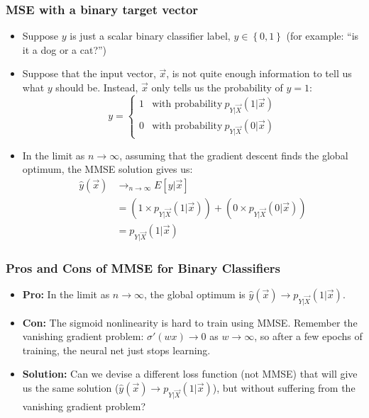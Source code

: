\documentclass{beamer}
\begin{document}
\begin{frame}
  \frametitle{MSE with a binary target vector}
  \begin{itemize}
  \item Suppose $y$ is just a scalar binary classifier label,
    $y\in\left\{0,1\right\}$ (for example: ``is it a dog or a cat?'')
  \item Suppose that the input vector, $\vec{x}$, is not quite enough
    information to tell us what $y$ should be.  Instead, $\vec{x}$ only tells us
    the probability of $y=1$:
    \[
    y=\left\{\begin{array}{ll}
    1 & \mbox{with probability}~p_{Y|\vec{X}}\left(1|\vec{x}\right)\\
    0 & \mbox{with probability}~p_{Y|\vec{X}}\left(0|\vec{x}\right)
    \end{array}\right.
    \]
  \item In the limit as $n\rightarrow\infty$, assuming that the
    gradient descent finds the global optimum, the MMSE solution gives
    us:
    \begin{align*}
      \hat{y}(\vec{x}) &\rightarrow_{n\rightarrow\infty}  E\left[y|\vec{x}\right]\\
      &= \left(1\times p_{Y|\vec{X}}\left(1|\vec{x}\right)\right) +
      \left(0\times p_{Y|\vec{X}}\left(0|\vec{x}\right)\right)\\
      &= p_{Y|\vec{X}}\left(1|\vec{x}\right)
    \end{align*}
  \end{itemize}
\end{frame}

\begin{frame}
  \frametitle{Pros and Cons of MMSE for Binary Classifiers}

  \begin{itemize}
  \item {\bf Pro:} In the limit as $n\rightarrow\infty$, the global optimum is
    $\hat{y}(\vec{x})\rightarrow p_{Y|\vec{X}}\left(1|\vec{x}\right)$.
  \item {\bf Con:} The sigmoid nonlinearity is hard to train using
    MMSE.  Remember the vanishing gradient problem: $\sigma'(wx)\rightarrow 0$
    as $w\rightarrow\infty$, so after a few epochs of training,
    the neural net just stops learning.
  \item {\bf Solution:} Can we devise a different loss function (not
    MMSE) that will give us the same solution
    ($\hat{y}(\vec{x})\rightarrow p_{Y|\vec{X}}\left(1|\vec{x}\right)$), but
    without suffering from the vanishing gradient problem?
  \end{itemize}
\end{frame}
\end{document}
